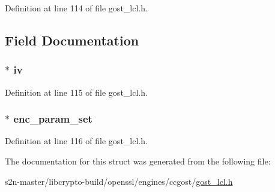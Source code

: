 Definition at line 114 of file gost\+\_\+lcl.\+h.



\subsection{Field Documentation}
\subsubsection[{\texorpdfstring{iv}{iv}}]{$\ast$ iv}\hypertarget{struct_g_o_s_t___c_i_p_h_e_r___p_a_r_a_m_s_a57a1987e7810a9dfef35da340b072e02}{}\label{struct_g_o_s_t___c_i_p_h_e_r___p_a_r_a_m_s_a57a1987e7810a9dfef35da340b072e02}


Definition at line 115 of file gost\+\_\+lcl.\+h.

\subsubsection[{\texorpdfstring{enc\+\_\+param\+\_\+set}{enc_param_set}}]{$\ast$ enc\+\_\+param\+\_\+set}\hypertarget{struct_g_o_s_t___c_i_p_h_e_r___p_a_r_a_m_s_a0c22c4e82f76702cee581c262677057f}{}\label{struct_g_o_s_t___c_i_p_h_e_r___p_a_r_a_m_s_a0c22c4e82f76702cee581c262677057f}


Definition at line 116 of file gost\+\_\+lcl.\+h.



The documentation for this struct was generated from the following file\+:\begin{DoxyCompactItemize}
\item 
s2n-\/master/libcrypto-\/build/openssl/engines/ccgost/\hyperlink{gost__lcl_8h}{gost\+\_\+lcl.\+h}\end{DoxyCompactItemize}
